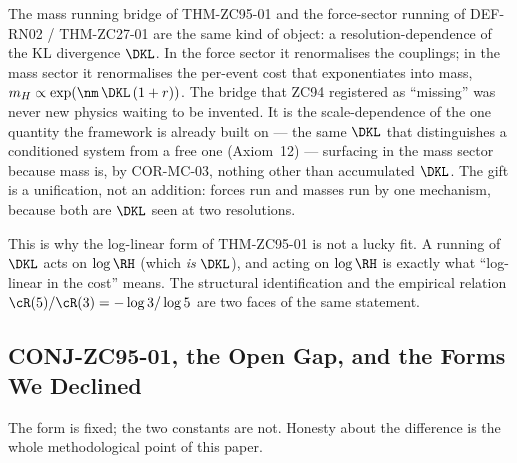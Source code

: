\documentclass[12pt, a4paper]{article}
\begin{document}
\begin{giftbox}[title={FIND-ZC95-01: The Mass Bridge Is Not New Physics}]
The mass running bridge of THM-ZC95-01 and the force-sector running of DEF-RN02
/ THM-ZC27-01 are the same kind of object: a resolution-dependence of the KL
divergence $\DKL$. In the force sector it renormalises the couplings; in the
mass sector it renormalises the per-event cost that exponentiates into mass,
$m_H\propto\exp(\nm\,\DKL\,(1+r))$. The bridge that ZC94 registered as
``missing'' was never new physics waiting to be invented. It is the
scale-dependence of the one quantity the framework is already built on ---
the same $\DKL$ that distinguishes a conditioned system from a free one
(Axiom~12) --- surfacing in the mass sector because mass is, by COR-MC-03,
nothing other than accumulated $\DKL$. The gift is a unification, not an
addition: forces run and masses run by one mechanism, because both are $\DKL$
seen at two resolutions.
\end{giftbox}

This is why the log-linear form of THM-ZC95-01 is not a lucky fit. A running of
$\DKL$ acts on $\log\RH$ (which \emph{is} $\DKL$), and acting on $\log\RH$ is
exactly what ``log-linear in the cost'' means. The structural identification and
the empirical relation $\cR(5)/\cR(3)=-\log3/\log5$ are two faces of the same
statement.


\subsection{CONJ-ZC95-01, the Open Gap, and the Forms We Declined}
\label{sec:conj-gap-zc95}

The form is fixed; the two constants are not. Honesty about the difference is
the whole methodological point of this paper.
\end{document}
